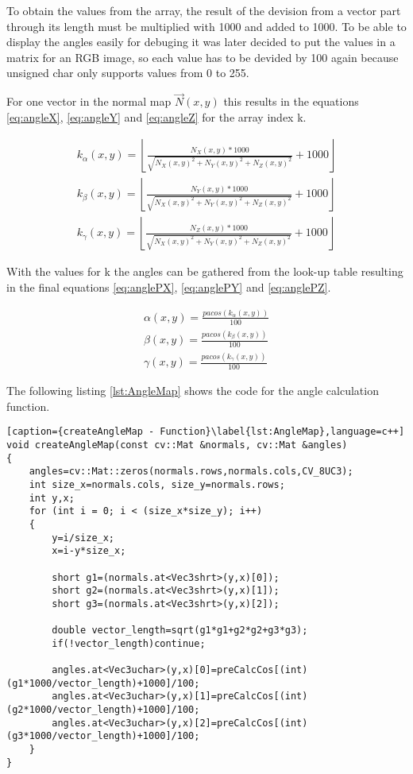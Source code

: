To obtain the values from the array, the result of the devision from a vector part through its length
must be multiplied with 1000 and added to 1000. To be able to display the angles easily for debuging 
it was later decided to put the values in a matrix for an RGB image, so each value has to be devided 
by 100 again because unsigned char only supports values from 0 to 255.

For one vector in the normal map $\vec{N}(x,y)$ this results in the equations \ref{eq:angleX}, \ref{eq:angleY} and
\vref{eq:angleZ} for the array index k.

\begin{align}
	k_\alpha(x,y) = \left\lfloor\frac{N_X(x,y)*1000}{\sqrt{N_X(x,y)^2+N_Y(x,y)^2+N_Z(x,y)^2}}+1000 \right\rfloor
	\label{eq:angleX}\\
	k_\beta(x,y) = \left\lfloor\frac{N_Y(x,y)*1000}{\sqrt{N_X(x,y)^2+N_Y(x,y)^2+N_Z(x,y)^2}}+1000 \right\rfloor
	\label{eq:angleY}\\
	k_\gamma(x,y) = \left\lfloor\frac{N_Z(x,y)*1000}{\sqrt{N_X(x,y)^2+N_Y(x,y)^2+N_Z(x,y)^2}}+1000 \right\rfloor
	\label{eq:angleZ}
\end{align} 

With the values for k the angles can be gathered from the look-up table resulting in the final equations \ref{eq:anglePX},
\ref{eq:anglePY} and \vref{eq:anglePZ}.

\begin{align}
	\alpha(x,y)=\frac{pacos({k_\alpha(x,y)})}{100}\label{eq:anglePX}\\
	\beta(x,y)=\frac{pacos({k_\beta(x,y)})}{100}\label{eq:anglePY}\\
	\gamma(x,y)=\frac{pacos({k_\gamma(x,y)})}{100}\label{eq:anglePZ}	
\end{align}



The following listing \vref{lst:AngleMap} shows the code for the angle calculation function.

\begin{lstlisting}[caption={createAngleMap - Function}\label{lst:AngleMap},language=c++]
void createAngleMap(const cv::Mat &normals, cv::Mat &angles)
{
	angles=cv::Mat::zeros(normals.rows,normals.cols,CV_8UC3);
	int size_x=normals.cols, size_y=normals.rows;
	int y,x;
	for (int i = 0; i < (size_x*size_y); i++)
	{ 
		y=i/size_x;
		x=i-y*size_x;

		short g1=(normals.at<Vec3shrt>(y,x)[0]);
		short g2=(normals.at<Vec3shrt>(y,x)[1]);
		short g3=(normals.at<Vec3shrt>(y,x)[2]);

		double vector_length=sqrt(g1*g1+g2*g2+g3*g3);
		if(!vector_length)continue;

		angles.at<Vec3uchar>(y,x)[0]=preCalcCos[(int)(g1*1000/vector_length)+1000]/100;
		angles.at<Vec3uchar>(y,x)[1]=preCalcCos[(int)(g2*1000/vector_length)+1000]/100;
		angles.at<Vec3uchar>(y,x)[2]=preCalcCos[(int)(g3*1000/vector_length)+1000]/100;
	}
}	
\end{lstlisting}

